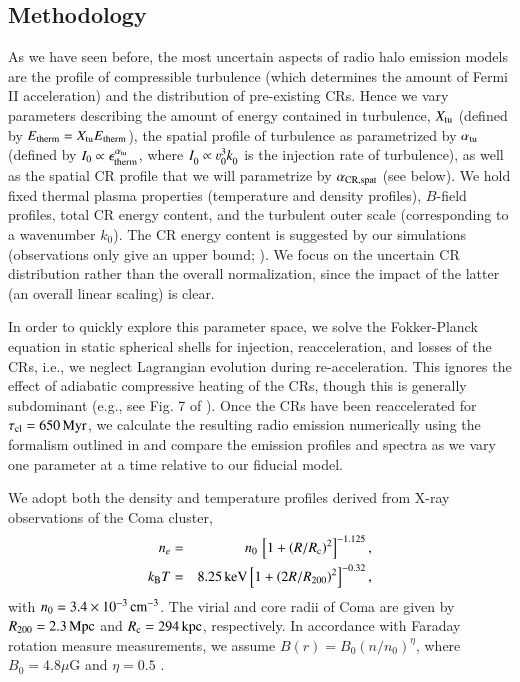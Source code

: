 \documentclass[fleqn,usenatbib,useAMS]{mnras}
\begin{document}
\subsection{Methodology}

As we have seen before, the most uncertain aspects of radio halo
emission models are the profile of compressible turbulence (which
determines the amount of Fermi II acceleration) and the distribution
of pre-existing CRs. Hence we vary parameters describing the amount of
energy contained in turbulence, $X_{\rm tu}$ (defined by $E_{\rm
  therm} = X_{\rm tu} E_{\rm therm}$), the spatial profile of
turbulence as parametrized by $\alpha_{\rm tu}$ (defined by $I_0
\propto \epsilon_{\rm therm}^{\alpha_{\rm tu}}$, where $I_0^{} \propto
\varv_0^{3} k_0^{}$ is the injection rate of turbulence), as well as
the spatial CR profile that we will parametrize by $\alpha_{\rm CR,
  spat}$ (see below).  We hold fixed thermal plasma properties
(temperature and density profiles), $B$-field profiles, total CR energy
content, and the turbulent outer scale (corresponding to a wavenumber
$k_{0}$). The CR energy content is suggested by our simulations
(observations only give an upper bound;
\citealt{2012ApJ...757..123A}). We focus on the uncertain CR
distribution rather than the overall normalization, since the impact
of the latter (an overall linear scaling) is clear.

In order to quickly explore this parameter space, we solve the
Fokker-Planck equation in static spherical shells for injection,
reacceleration, and losses of the CRs, i.e., we neglect Lagrangian
evolution during re-acceleration.  This ignores the effect of
adiabatic compressive heating of the CRs, though this is generally
subdominant (e.g., see Fig. 7 of \citealt{miniati15}). Once
the CRs have been reaccelerated for $\tau_{\mathrm{cl}} = 650\,{\mathrm{Myr}}$,
we calculate the resulting radio emission numerically using the
formalism outlined in \cite{1979rpa..book.....R} and compare the
emission profiles and spectra as we vary one parameter at a time
relative to our fiducial model.

We adopt both the density \citep{1992A&A...259L..31B} and temperature
profiles \citep{2009ApJ...696.1886B,2001A&A...365L..67A} derived from
X-ray observations of the Coma cluster,
\begin{eqnarray}
n_e &=& n_0\,\left[1+\left(R/R_{{\mathrm{c}}}\right)^2\right]^{-1.125},\nonumber\\
k_{{\mathrm{B}}} T &=& 8.25\,{\mathrm{keV}} \left[1+\left(2R/R_{200}\right)^2\right]^{-0.32},
\end{eqnarray}
with $n_0=3.4\times10^{-3}\,{\mathrm{cm}}^{-3}$.  The virial and core radii
of Coma are given by $R_{200} = 2.3\,{\mathrm{Mpc}}$
\citep{2002ApJ...567..716R} and $R_{{\mathrm{c}}} = 294\,{\mathrm{kpc}}$,
respectively. In accordance with Faraday rotation measure
measurements, we assume $B(r)=B_{0} (n/n_{0})^{\eta}$, where
$B_{0}=4.8 \mu$G and $\eta=0.5$ \citep{bonafede10}.
\end{document}
